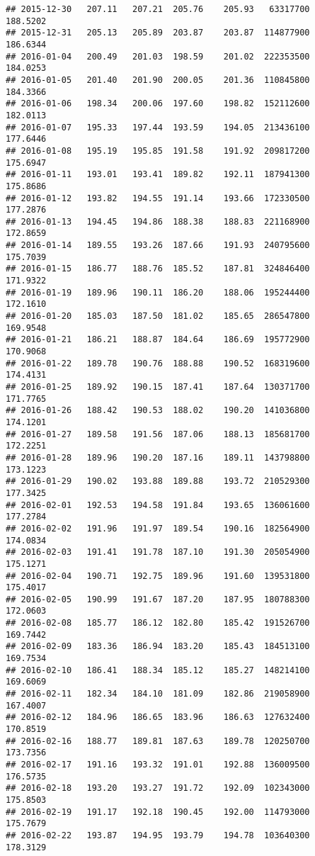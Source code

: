 \documentclass[
]{article}
\begin{document}
\begin{verbatim}
## 2015-12-30   207.11   207.21  205.76    205.93   63317700     188.5202
## 2015-12-31   205.13   205.89  203.87    203.87  114877900     186.6344
## 2016-01-04   200.49   201.03  198.59    201.02  222353500     184.0253
## 2016-01-05   201.40   201.90  200.05    201.36  110845800     184.3366
## 2016-01-06   198.34   200.06  197.60    198.82  152112600     182.0113
## 2016-01-07   195.33   197.44  193.59    194.05  213436100     177.6446
## 2016-01-08   195.19   195.85  191.58    191.92  209817200     175.6947
## 2016-01-11   193.01   193.41  189.82    192.11  187941300     175.8686
## 2016-01-12   193.82   194.55  191.14    193.66  172330500     177.2876
## 2016-01-13   194.45   194.86  188.38    188.83  221168900     172.8659
## 2016-01-14   189.55   193.26  187.66    191.93  240795600     175.7039
## 2016-01-15   186.77   188.76  185.52    187.81  324846400     171.9322
## 2016-01-19   189.96   190.11  186.20    188.06  195244400     172.1610
## 2016-01-20   185.03   187.50  181.02    185.65  286547800     169.9548
## 2016-01-21   186.21   188.87  184.64    186.69  195772900     170.9068
## 2016-01-22   189.78   190.76  188.88    190.52  168319600     174.4131
## 2016-01-25   189.92   190.15  187.41    187.64  130371700     171.7765
## 2016-01-26   188.42   190.53  188.02    190.20  141036800     174.1201
## 2016-01-27   189.58   191.56  187.06    188.13  185681700     172.2251
## 2016-01-28   189.96   190.20  187.16    189.11  143798800     173.1223
## 2016-01-29   190.02   193.88  189.88    193.72  210529300     177.3425
## 2016-02-01   192.53   194.58  191.84    193.65  136061600     177.2784
## 2016-02-02   191.96   191.97  189.54    190.16  182564900     174.0834
## 2016-02-03   191.41   191.78  187.10    191.30  205054900     175.1271
## 2016-02-04   190.71   192.75  189.96    191.60  139531800     175.4017
## 2016-02-05   190.99   191.67  187.20    187.95  180788300     172.0603
## 2016-02-08   185.77   186.12  182.80    185.42  191526700     169.7442
## 2016-02-09   183.36   186.94  183.20    185.43  184513100     169.7534
## 2016-02-10   186.41   188.34  185.12    185.27  148214100     169.6069
## 2016-02-11   182.34   184.10  181.09    182.86  219058900     167.4007
## 2016-02-12   184.96   186.65  183.96    186.63  127632400     170.8519
## 2016-02-16   188.77   189.81  187.63    189.78  120250700     173.7356
## 2016-02-17   191.16   193.32  191.01    192.88  136009500     176.5735
## 2016-02-18   193.20   193.27  191.72    192.09  102343000     175.8503
## 2016-02-19   191.17   192.18  190.45    192.00  114793000     175.7679
## 2016-02-22   193.87   194.95  193.79    194.78  103640300     178.3129

\end{verbatim}
\end{document}
